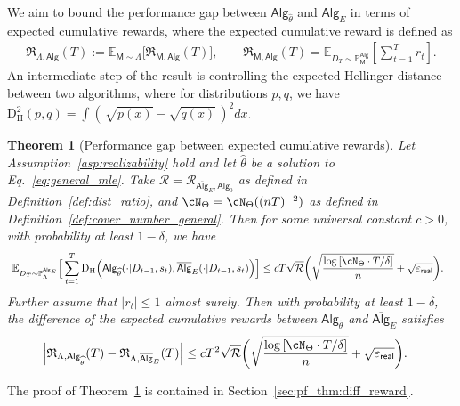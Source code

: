 \documentclass[10pt]{article}
\newtheorem{theorem}{Theorem}
\renewcommand{\epsilon}{\varepsilon}
\newcommand{\<}{\left\langle}
\renewcommand{\>}{\right\rangle}
\newcommand{\paren}[1]{{\left( #1 \right)}}
\newcommand{\brac}[1]{{\left[ #1 \right]}}
\newcommand{\E}{\mathbb{E}}
\renewcommand{\P}{\mathbb{P}}
\newcommand{\inst}{{\mathsf{M}}}
\newcommand{\HelDs}{{\mathrm{D}^2_{\mathrm{H}}}}
\newcommand{\HelD}{{\mathrm{D}_{\mathrm{H}}}}
\newcommand{\state}{{s}}
\newcommand{\reward}{{r}}
\newcommand{\totlen}{{T}} %
\newcommand{\sAlg}{{\mathsf{Alg}}}
\newcommand{\osAlg}{\overline{\mathsf{Alg}}}
\newcommand{\dset}{{D}}
\newcommand{\Numobs}{{n}}   %
\newcommand{\Parspace}{{\Theta}}
\newcommand{\EstPar}{{\widehat{\theta}}}
\newcommand{\prior}{{\Lambda}}
\newcommand{\shortexp}{{E}}
\newcommand{\geneps}{{\epsilon}_{\sf real}}
\newcommand{\totreward}{{\mathfrak{R}}}  %
\newcommand{\distratio}{{\mathcal{R}}}
\newcommand{\authnote}[2]{{\scriptsize $\ll$\textsf{#1 notes: #2}$\gg$}}
\newcommand{\authnote}[2]{}
\newcommand{\yub}[1]{{\color{red}\authnote{Yu}{#1}}}
\newcommand{\lc}[1]{{\color{blue}\authnote{Licong}{#1}}}
\begin{document}
We aim to bound the performance gap between $\sAlg_{\EstPar}$ and $\sAlg_\shortexp$ in terms of expected cumulative rewards, where the expected cumulative reward is defined as 
\begin{align*}
\textstyle \totreward_{\prior,\sAlg}(\totlen)
:= \E_{\inst\sim\prior}\big[\totreward_{\inst,\sAlg}(\totlen) \big],~~~~~~~~~ \totreward_{\inst,\sAlg}(\totlen) = \E_{\dset_{\totlen} \sim\P^{\sAlg}_\inst}[\sum_{t=1}^\totlen \reward_t].
\end{align*}
An intermediate step of the result is controlling the expected Hellinger distance between two algorithms, where for distributions $p, q$, we have $\HelDs(p, q) = \int (\,\sqrt{p(x)} - \sqrt{q(x)} \,)^2 d x$. 

\begin{theorem}[Performance gap between expected cumulative rewards]\label{thm:diff_reward} Let Assumption~\ref{asp:realizability} hold and let $\EstPar$ be a solution to Eq.~\eqref{eq:general_mle}. Take $\distratio = \distratio_{\osAlg_\shortexp,\sAlg_0}$ as defined in Definition~\ref{def:dist_ratio}, and $\cN_{\Parspace} = \cN_{\Parspace}((\Numobs\totlen)^{-2})$  as defined in Definition~\ref{def:cover_number_general}. Then for some universal constant $c>0$, with probability at least $1-\delta$, we have 
\begin{align}\label{eqn:Hellinger-bound-main-theorem}
&~ \E_{\dset_\totlen\sim \P^{\sAlg_\shortexp}_\prior}\Big[ \sum_{t=1}^\totlen \HelD \paren{  \sAlg_{{\EstPar}}(\cdot|\dset_{t-1},\state_t ),\osAlg_{\shortexp}(\cdot|\dset_{t-1},\state_t )} \Big] 
\le c {\totlen} \sqrt{\distratio}
\bigg(\sqrt{\frac{\log \brac{ \cN_{\Parspace} \cdot 
 \totlen/\delta } }{n}} +  \sqrt{\geneps}\bigg).
\end{align} 
Further assume that $|\reward_t| \leq 1$ almost surely. Then with probability at least $1-\delta$, the difference of the expected cumulative rewards between $\sAlg_\EstPar$ and $\osAlg_\shortexp$ satisfies
\begin{align}\label{eqn:reward-bound-main-theorem}
\Big|\totreward_{\prior,\sAlg_\EstPar}(\totlen)-\totreward_{\prior,\osAlg_\shortexp}(\totlen)\Big|
&\leq 
c \totlen^2 \sqrt{\distratio} \bigg(\sqrt{\frac{\log \brac{ \cN_{\Parspace} \cdot 
 \totlen/\delta } }{n}} +  \sqrt{\geneps}\bigg).
\end{align}
\end{theorem}

The proof of Theorem~\ref{thm:diff_reward} is contained in Section~\ref{sec:pf_thm:diff_reward}.
\end{document}
